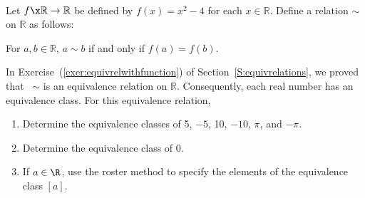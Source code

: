 \begin{prog} \label{prog:equivclass} \hfill \\
Let  $f\x \mathbb{R} \to \mathbb{R}$ be defined by  $f( x ) = x^2  - 4$ for each  
$x \in \mathbb{R}$.  Define a relation  $\sim$  on  $\mathbb{R}$  as follows:
\begin{center}
For  $a, b \in \mathbb{R}$,  $a \sim b$ if and only if  
$f( a ) = f( b )$.
\end{center}
In Exercise~(\ref{exer:equivrelwithfunction}) of Section~\ref{S:equivrelations}, we proved that  ~$\sim$ is an equivalence relation on  $\mathbb{R}$.  Consequently, each real number has an equivalence class.  For this equivalence relation,
\begin{enumerate}
\item Determine the equivalence classes of  5, $-5$, 10, $-10$, $\pi$, and $-\pi$.
\item Determine the equivalence class of 0.
\item If $a \in \R$, use the roster method to specify the elements of the equivalence class 
$[ a ]$.
\end{enumerate} 
%
\end{prog}
\hbreak

